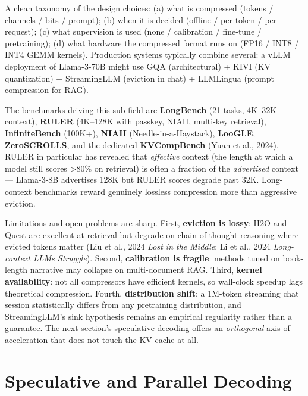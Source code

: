 A clean taxonomy of the design choices: (a) what is compressed (tokens / channels / bits / prompt); (b) when it is decided (offline / per-token / per-request); (c) what supervision is used (none / calibration / fine-tune / pretraining); (d) what hardware the compressed format runs on (FP16 / INT8 / INT4 GEMM kernels). Production systems typically combine several: a vLLM deployment of Llama-3-70B might use GQA (architectural) + KIVI (KV quantization) + StreamingLLM (eviction in chat) + LLMLingua (prompt compression for RAG).

The benchmarks driving this sub-field are \textbf{LongBench} (21 tasks, 4K--32K context), \textbf{RULER} (4K--128K with passkey, NIAH, multi-key retrieval), \textbf{InfiniteBench} (100K+), \textbf{NIAH} (Needle-in-a-Haystack), \textbf{LooGLE}, \textbf{ZeroSCROLLS}, and the dedicated \textbf{KVCompBench} (Yuan et al., 2024). RULER in particular has revealed that \emph{effective} context (the length at which a model still scores \textgreater80\% on retrieval) is often a fraction of the \emph{advertised} context --- Llama-3-8B advertises 128K but RULER scores degrade past 32K. Long-context benchmarks reward genuinely lossless compression more than aggressive eviction.

Limitations and open problems are sharp. First, \textbf{eviction is lossy}: H2O and Quest are excellent at retrieval but degrade on chain-of-thought reasoning where evicted tokens matter (Liu et al., 2024 \emph{Lost in the Middle}; Li et al., 2024 \emph{Long-context LLMs Struggle}). Second, \textbf{calibration is fragile}: methods tuned on book-length narrative may collapse on multi-document RAG. Third, \textbf{kernel availability}: not all compressors have efficient kernels, so wall-clock speedup lags theoretical compression. Fourth, \textbf{distribution shift}: a 1M-token streaming chat session statistically differs from any pretraining distribution, and StreamingLLM's sink hypothesis remains an empirical regularity rather than a guarantee. The next section's speculative decoding offers an \emph{orthogonal} axis of acceleration that does not touch the KV cache at all.

\section{Speculative and Parallel Decoding}\label{speculative-and-parallel-decoding}

